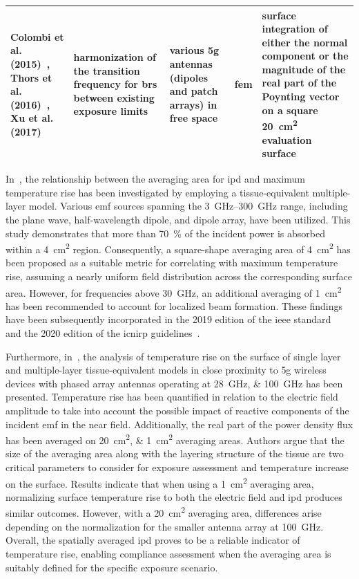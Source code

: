 \begin{table}
\begin{center}
\begin{tabularx}{\textwidth}{|X|X|X|X|X|}
\hline
Colombi et al. (2015)~\cite{Colombi2015Implications}, Thors et al. (2016)~\cite{Thors2016Exposure}, Xu et al. (2017)~\cite{Xu2017Understanding} & harmonization of the transition frequency for \gls{br}s between existing exposure limits & various \gls{5g} antennas (dipoles and patch arrays) in free space & \gls{fem} & surface integration of either the normal component or the magnitude of the real part of the Poynting vector on a square \SI{20}{\cm\squared} evaluation surface\\
\hline
\end{tabularx}
\end{center}
\end{table}

In~\cite{Hashimoto2017averaging}, the relationship between the averaging area for \gls{ipd} and maximum temperature rise has been investigated by employing a tissue-equivalent multiple-layer model.
Various \gls{emf} sources spanning the \SIrange{3}{300}{\GHz} range, including the plane wave, half-wavelength dipole, and dipole array, have been utilized.
This study demonstrates that more than \SI{70}{\percent} of the incident power is absorbed within a \SI{4}{\cm\squared} region.
Consequently, a square-shape averaging area of \SI{4}{\cm\squared} has been proposed as a suitable metric for correlating with maximum temperature rise, assuming a nearly uniform field distribution across the corresponding surface area.
However, for frequencies above \SI{30}{\GHz}, an additional averaging of \SI{1}{\cm\squared} has been recommended to account for localized beam formation.
These findings have been subsequently incorporated in the 2019 edition of the \gls{ieee} standard~\cite{IEEE2019Standard} and the 2020 edition of the \gls{icnirp} guidelines~\cite{ICNIRP2020Guidelines}.

Furthermore, in~\cite{Christ2018Thermal}, the analysis of temperature rise on the surface of single layer and multiple-layer tissue-equivalent models in close proximity to \gls{5g} wireless devices with phased array antennas operating at \SIlist{28;100}{\GHz} has been presented.
Temperature rise has been quantified in relation to the electric field amplitude to take into account the possible impact of reactive components of the incident \gls{emf} in the near field.
Additionally, the real part of the power density flux has been averaged on \SIlist{20;1}{\cm\squared} averaging areas.
Authors argue that the size of the averaging area along with the layering structure of the tissue are two critical parameters to consider for exposure assessment and temperature increase on the surface.
Results indicate that when using a \SI{1}{\cm\squared} averaging area, normalizing surface temperature rise to both the electric field and \gls{ipd} produces similar outcomes.
However, with a \SI{20}{\cm\squared} averaging area, differences arise depending on the normalization for the smaller antenna array at \SI{100}{\GHz}.
Overall, the spatially averaged \gls{ipd} proves to be a reliable indicator of temperature rise, enabling compliance assessment when the averaging area is suitably defined for the specific exposure scenario.


